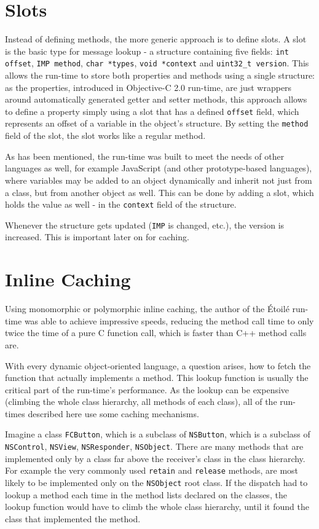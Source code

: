 \section{Slots}
Instead of defining methods, the more generic approach is to define slots. A slot is the basic type for message lookup - a structure containing five fields: \verb=int offset=, \verb=IMP method=, \verb=char *types=, \verb=void *context= and \verb=uint32_t version=. This allows the run-time to store both properties and methods using a single structure: as the properties, introduced in Objective-C 2.0 run-time, are just wrappers around automatically generated getter and setter methods, this approach allows to define a property simply using a slot that has a defined \verb=offset= field, which represents an offset of a variable in the object's structure. By setting the \verb=method= field of the slot, the slot works like a regular method.

As has been mentioned, the run-time was built to meet the needs of other languages as well, for example JavaScript (and other prototype-based languages), where variables may be added to an object dynamically and inherit not just from a class, but from another object as well. This can be done by adding a slot, which holds the value as well - in the \verb=context= field of the structure.

Whenever the structure gets updated (\verb=IMP= is changed, etc.), the version is increased. This is important later on for caching.


\section{Inline Caching}
Using monomorphic or polymorphic inline caching, the author of the \'Etoil\'e run-time was able to achieve impressive speeds, reducing the method call time to only twice the time of a pure C function call, which is faster than C++ method calls are.

With every dynamic object-oriented language, a question arises, how to fetch the function that actually implements a method. This lookup function is usually the critical part of the run-time's performance. As the lookup can be expensive (climbing the whole class hierarchy, all methods of each class), all of the run-times described here use some caching mechanisms.

Imagine a class \verb=FCButton=, which is a subclass of \verb=NSButton=, which is a subclass of \verb=NSControl=, \verb=NSView=, \verb=NSResponder=, \verb=NSObject=. There are many methods that are implemented only by a class far above the receiver's class in the class hierarchy. For example the very commonly used \verb=retain= and \verb=release= methods, are most likely to be implemented only on the \verb=NSObject= root class. If the dispatch had to lookup a method each time in the method lists declared on the classes, the lookup function would have to climb the whole class hierarchy, until it found the class that implemented the method.


